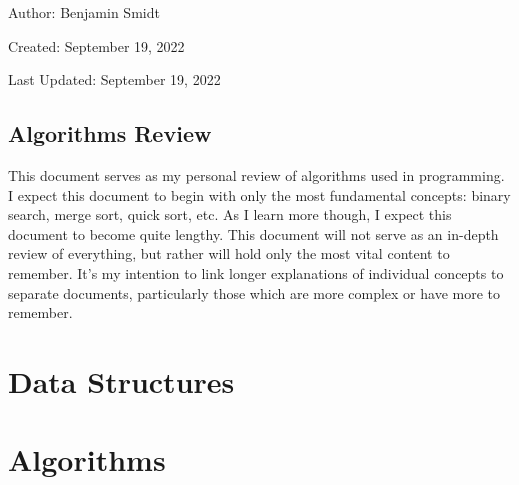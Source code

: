\documentclass[12pt]{article}
\begin{document}
\noindent Author: Benjamin Smidt

\noindent Created: September 19, 2022

\noindent Last Updated: September 19, 2022
\begin{center}
\section*{Algorithms Review}
\end{center}

\noindent This document serves as my personal review of algorithms used in programming. 
I expect this document to begin with only the most fundamental concepts: binary search, merge sort, 
quick sort, etc. As I learn more though, I expect this document to become quite lengthy. This 
document will not serve as an in-depth review of everything, but rather will hold only the most vital content
to remember. It's my intention to link longer explanations of individual concepts to separate documents, 
particularly those which are more complex or have more to remember. 

\section{Data Structures}

\section{Algorithms}
\end{document}
